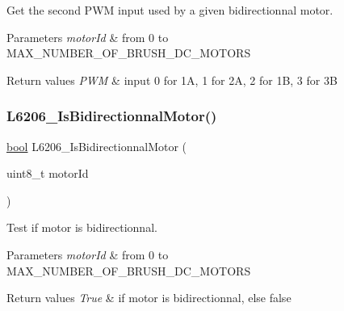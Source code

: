 Get the second P\+WM input used by a given bidirectionnal motor. 


\begin{DoxyParams}{Parameters}
{\em motor\+Id} & from 0 to M\+A\+X\+\_\+\+N\+U\+M\+B\+E\+R\+\_\+\+O\+F\+\_\+\+B\+R\+U\+S\+H\+\_\+\+D\+C\+\_\+\+M\+O\+T\+O\+RS \\
\hline
\end{DoxyParams}

\begin{DoxyRetVals}{Return values}
{\em P\+WM} & input 0 for 1A, 1 for 2A, 2 for 1B, 3 for 3B \\
\hline
\end{DoxyRetVals}
\mbox{\label{group___l6206___private__functions_ga3f9ca538e4da03d6cb2f502d4a1b759c}} 
\subsubsection{\texorpdfstring{L6206\+\_\+\+Is\+Bidirectionnal\+Motor()}{L6206\_IsBidirectionnalMotor()}}
{\footnotesize\ttfamily \mbox{\hyperlink{group___motor___boolean___type_ga0ecf26b576b9a54eca656b9be7ba6a06}{bool}} L6206\+\_\+\+Is\+Bidirectionnal\+Motor (\begin{DoxyParamCaption}\item[{uint8\+\_\+t}]{motor\+Id }\end{DoxyParamCaption})}



Test if motor is bidirectionnal. 


\begin{DoxyParams}{Parameters}
{\em motor\+Id} & from 0 to M\+A\+X\+\_\+\+N\+U\+M\+B\+E\+R\+\_\+\+O\+F\+\_\+\+B\+R\+U\+S\+H\+\_\+\+D\+C\+\_\+\+M\+O\+T\+O\+RS \\
\hline
\end{DoxyParams}

\begin{DoxyRetVals}{Return values}
{\em True} & if motor is bidirectionnal, else false \\
\hline
\end{DoxyRetVals}
\mbox{\label{group___l6206___private__functions_ga3379bc215227e0a4081b7a42f3c5532a}} 
